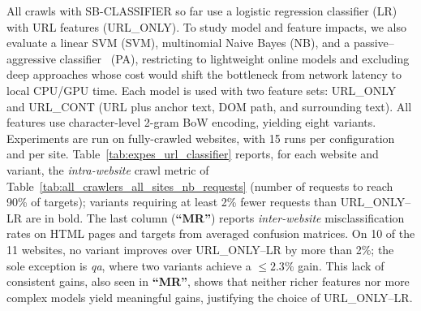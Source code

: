 All crawls with \textsf{\small SB-CLASSIFIER} so far use a logistic
regression classifier (\textsc{LR}) with URL features
(\textsc{URL\_ONLY}). To study model and feature impacts, we also
evaluate a linear SVM (\textsc{SVM}), multinomial Naive Bayes
(\textsc{NB}), and a passive--aggressive
classifier~\cite{crammer2006online} (\textsc{PA}), restricting to
lightweight online models and excluding deep approaches whose cost would
shift the bottleneck from network latency to local CPU/GPU time. Each
model is used with two feature sets: \textsc{URL\_ONLY} and
\textsc{URL\_CONT} (URL plus anchor text, DOM path, and surrounding
text). All features use character-level 2-gram BoW encoding, yielding
eight variants. Experiments are run on fully-crawled websites, with 15
runs per configuration and per site. Table~\ref{tab:expes_url_classifier}
reports, for each website and variant, the \emph{intra-website} crawl
metric of Table~\ref{tab:all_crawlers_all_sites_nb_requests} (number of
requests to reach 90\% of targets); variants requiring at least 2\% fewer
requests than \textsc{URL\_ONLY--LR} are in bold. The last column
(\textbf{``MR''}) reports \emph{inter-website} misclassification rates on
HTML pages and targets from averaged confusion matrices. On 10 of the 11
websites, no variant improves over \textsc{URL\_ONLY--LR} by more than
2\%; the sole exception is \emph{qa}, where two variants achieve a $\leq
2.3\%$ gain. This lack of consistent gains, also seen in \textbf{``MR''}, shows that neither richer features nor more complex models yield meaningful gains, justifying the choice of \textsc{URL\_ONLY--LR}.


